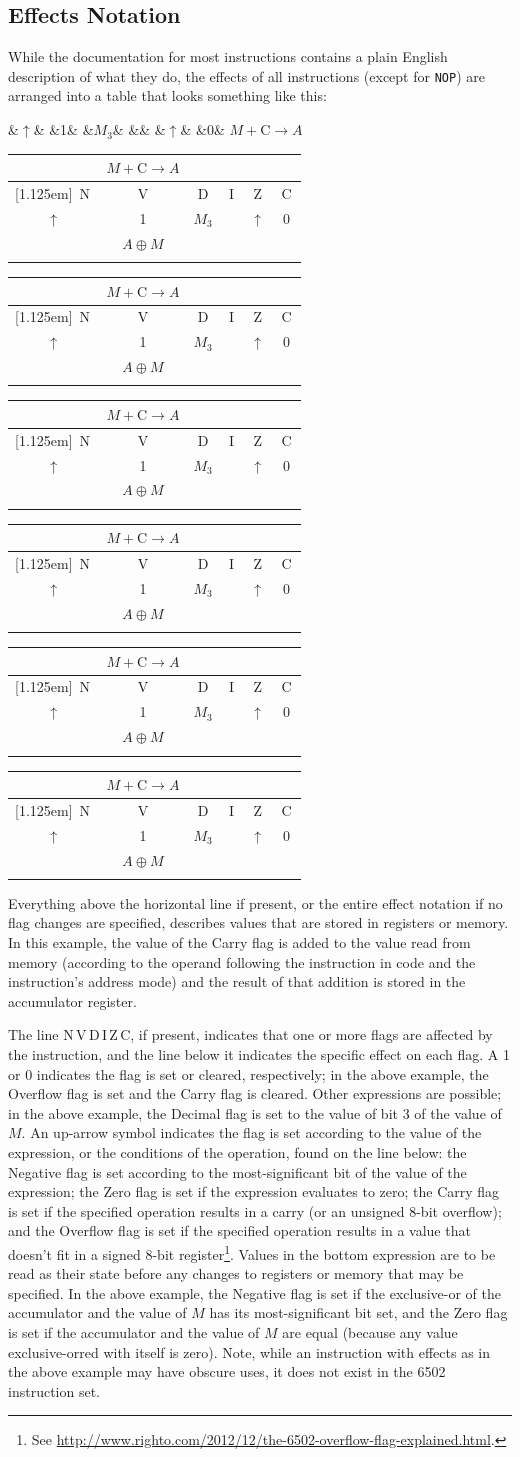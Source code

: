 \documentclass[12pt]{{memoir}}
\newcommand\Hline{%
\hline\raisebox{0pt}[1.125em]{}}
\newcommand\flageffects[8]{%
\begin{tabular}[t]{cccccc}
\ifx&#1&%
  \empty
\else
  \multicolumn{6}{c}{\hspace*{-1em}#1\hspace*{-1em}} \\
  \Hline
\fi
\,N\, & \,V\, & \,D\, & \,I\, & \,Z\, & \,C\, \\
#2 & #3 & #4 & #5 & #6 & #7 \\
\ifx&#8&%
  \empty
\else%
  \multicolumn{6}{c}{#8} \\
\fi
\end{tabular}\hspace{1em}}
\newcommand\opeffects[8]{%
\ifx&#2&%
  \ifx&#3&%
    \ifx&#4&%
      \ifx&#5&%
        \ifx&#6&%
          \ifx&#7&%
            {#1}\hspace{1em}
          \else
            \flageffects{#1}{#2}{#3}{#4}{#5}{#6}{#7}{#8}
          \fi
        \else
          \flageffects{#1}{#2}{#3}{#4}{#5}{#6}{#7}{#8}
        \fi
      \else
        \flageffects{#1}{#2}{#3}{#4}{#5}{#6}{#7}{#8}
      \fi
    \else
      \flageffects{#1}{#2}{#3}{#4}{#5}{#6}{#7}{#8}
    \fi
  \else
    \flageffects{#1}{#2}{#3}{#4}{#5}{#6}{#7}{#8}
  \fi
\else
  \flageffects{#1}{#2}{#3}{#4}{#5}{#6}{#7}{#8}
\fi
}
\begin{document}
\subsection{Effects Notation}
While the documentation for most instructions contains a plain English description of what they do, the effects of all instructions (except for \texttt{NOP}) are arranged into a table that looks something like this:

\nopagebreak\begin{center}\nopagebreak\opeffects{$M + \text{C} \to A$}
{$\uparrow$}{1}{$M_3$}{}{$\uparrow$}{0}
{$A \oplus M$}\end{center}

Everything above the horizontal line if present, or the entire effect notation if no flag changes are specified, describes values that are stored in registers or memory. In this example, the value of the Carry flag is added to the value read from memory (according to the operand following the instruction in code and the instruction's address mode) and the result of that addition is stored in the accumulator register.

The line N\,V\,D\,I\,Z\,C, if present, indicates that one or more flags are affected by the instruction, and the line below it indicates the specific effect on each flag. A 1 or 0 indicates the flag is set or cleared, respectively; in the above example, the Overflow flag is set and the Carry flag is cleared. Other expressions are possible; in the above example, the Decimal flag is set to the value of bit 3 of the value of $M$. An up-arrow symbol indicates the flag is set according to the value of the expression, or the conditions of the operation, found on the line below: the Negative flag is set according to the most-significant bit of the value of the expression; the Zero flag is set if the expression evaluates to zero; the Carry flag is set if the specified operation results in a carry (or an unsigned 8-bit overflow); and the Overflow flag is set if the specified operation results in a value that doesn't fit in a signed 8-bit register\footnote{See \url{http://www.righto.com/2012/12/the-6502-overflow-flag-explained.html}.}. Values in the bottom expression are to be read as their state before any changes to registers or memory that may be specified. In the above example, the Negative flag is set if the exclusive-or of the accumulator and the value of $M$ has its most-significant bit set, and the Zero flag is set if the accumulator and the value of $M$ are equal (because any value exclusive-orred with itself is zero).
Note, while an instruction with effects as in the above example may have obscure uses, it does not exist in the 6502 instruction set.
\end{document}
